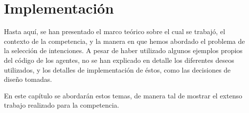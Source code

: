 \documentclass[oneside]{book}
\theoremstyle{definition}
\begin{document}
%
%
%
%







\chapter{Implementación}

Hasta aquí, se han presentado el marco teórico sobre el cual se trabajó, el contexto
de la competencia, y la manera en que hemos abordado el problema de la selección de
intenciones. A pesar de haber utilizado algunos ejemplos propios del código de los 
agentes, no se han explicado en detalle los diferentes deseos utilizados, y los 
detalles de implementación de éstos, como las decisiones de diseño tomadas.

En este capítulo se abordarán estos temas, de manera tal de mostrar el extenso 
trabajo realizado para la competencia.
\end{document}

